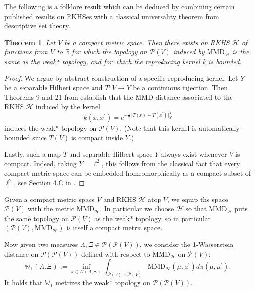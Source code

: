 \documentclass[aos, preprint]{imsart}
\theoremstyle{plain}
\newtheorem{theorem}{Theorem}[section]
\theoremstyle{remark}
\begin{document}
\begin{appendix}
The following is a folklore result which can be deduced by combining
certain published results on RKHSes with a classical universality theorem from descriptive set theory.
\begin{theorem}
  Let $V$ be a compact metric space. Then there exists an RKHS
  $\mathcal{H}$ of functions from $V$ to $\mathbb{R}$ for which the
  topology on $\mathcal{P}(V)$ induced by $\text{MMD}_{\mathcal{H}}$
  is the same as the weak{*} topology, and for which the reproducing
  kernel $k$ is bounded.
\end{theorem}
\begin{proof}
We argue by abstract construction of a specific reproducing kernel. Let $Y$ be a separable Hilbert space and $T:V\rightarrow Y$ be a continuous injection. Then Theorems 9 and 21 from \cite{wynne2022kernel} establish that the MMD distance associated to the RKHS $\mathcal{H}$ induced by the kernel $$k(x,x^\prime)=e^{-\frac{1}{2}\Vert T(x) - T(x^\prime)\Vert^2_Y}$$
induces the weak* topology on $\mathcal{P}(V)$. (Note that this kernel is automatically bounded since $T(V)$ is compact inside $Y$.)

Lastly, such a map $T$ and separable Hilbert space $Y$ always exist whenever $V$ is compact. Indeed, taking $Y=\ell^2$, this follows from the classical fact that every compact metric space can be embedded homeomorphically as a compact subset of  $\ell^2$, see Section 4.C in \cite{kechris2012classical}.
\end{proof}
Given a compact metric space $V$ and RKHS $\mathcal{H}$ atop $V$,
we equip the space $\mathcal{P}(V)$ with the metric $\text{MMD}_{\mathcal{H}}$.
In particular we choose $\mathcal{H}$ so that $\text{MMD}_{\mathcal{H}}$
puts the same topology on $\mathcal{P}(V)$ as the weak{*} topology,
so in particular $(\mathcal{P}(V),\text{MMD}_{\mathcal{H}})$ is itself
a compact metric space.


Now given two measures $\Lambda,\Xi\in\mathcal{P}(\mathcal{P}(V))$,
we consider the 1-Wasserstein distance on $\mathcal{P}(\mathcal{P}(V))$
defined with respect to $\text{MMD}_{\mathcal{H}}$ on $\mathcal{P}(V)$:
\[
\mathbb{W}_{1}(\Lambda,\Xi):=\inf_{\pi\in\Pi(\Lambda,\Xi)}\int_{\mathcal{P}(V)\times\mathcal{P}(V)}\text{MMD}_{\mathcal{H}}(\mu,\mu^{\prime})d\pi(\mu,\mu^{\prime}).
\]
It holds that $\mathbb{W}_{1}$ metrizes the weak{*} topology on $\mathcal{P}(\mathcal{P}(V))$.


\end{appendix}
\end{document}
